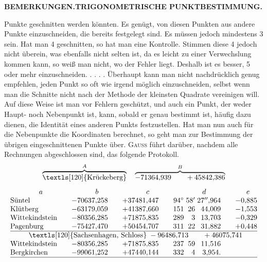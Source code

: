 \par\clearpage
\noindent{}\hfill{\small\textbf{BEMERKUNGEN.\quad TRIGONOMETRISCHE PUNKTBESTIMMUNG.}}\hfill\null\par\medskip

{\small
\noindent Punkte geschnitten werden könnten. Es genügt, von diesen Punkten aus andere Punkte einzuschneiden, die bereits festgelegt sind. Es müssen jedoch mindestens 3 sein. Hat man 4 geschnitten, so hat man eine Kontrolle. Stimmen diese 4 jedoch nicht überein, was ebenfalls nicht selten ist, da es leicht zu einer Verwechslung kommen kann, so weiß man nicht, wo der Fehler liegt. Deshalb ist es besser, 5 oder mehr einzuschneiden. . . . . Überhaupt kann man nicht nachdrücklich genug empfehlen, jeden Punkt so oft wie irgend möglich einzuschneiden, selbst wenn man die Schnitte nicht nach der Methode der kleinsten Quadrate vereinigen will. Auf diese Weise ist man vor Fehlern geschützt, und auch ein Punkt, der weder Haupt- noch Nebenpunkt ist, kann, sobald er genau bestimmt ist, häufig dazu dienen, die Identität eines anderen Punkts festzustellen. Hat man nun auch für die Nebenpunkte die Koordinaten berechnet, so geht man zur Bestimmung der übrigen eingeschnittenen Punkte über. \textsc{Gauss} führt darüber, nachdem alle\\
Rechnungen abgeschlossen sind, das folgende Protokoll.
\[
 \overbrace{\text{\textls[120]{Krückeberg}}}^{A}
 \quad\overbrace{-71364{,}939\qquad+45842{,}386}^{B}
\]
\[
\begin{array}{@{}l@{\qquad}r@{\qquad}r@{\qquad}r@{\;}r@{\;}r@{\qquad}r@{}}
 \multicolumn{1}{c}{a}&\multicolumn{1}{c}{b}&\multicolumn{1}{c}{c}&
 \multicolumn{3}{c}{d}&\multicolumn{1}{c@{}}{e}\\
 \text{Süntel}&-70637{,}258&+37481{,}447&94^\circ&58'&27''{,}964&-0{,}885\\
 \text{Klütberg}&-63179{,}059&+41387{,}660&151&26&44{,}009&-1{,}553\\
 \text{Wittekindstein}&-80356{,}285&+71875{,}835&289&3&13{,}703&-0{,}329\\
 \text{Pagenburg}&-75427{,}470&+50454{,}707&311&22&31{,}882&+0{,}448\\
 \hline
 \multicolumn{7}{c@{}}{\text{\textls[120]{Sachsenhagen, Schloss}}\;-96486{,}713\qquad+46075{,}741}\\
 \text{Wittekindstein}&-80356{,}285&+71875{,}835&237&59&11{,}516&\\
 \text{Bergkirchen}&-99061{,}252&+47440{,}144&332&4&3{,}954.&\\
 \hline
\end{array}
\]

}

